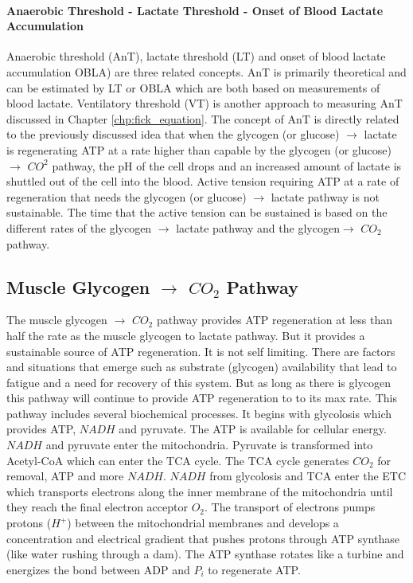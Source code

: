 \paragraph{Anaerobic Threshold - Lactate Threshold - Onset of Blood Lactate Accumulation}
Anaerobic threshold (AnT), lactate threshold (LT) and onset of blood lactate accumulation OBLA) are three related concepts. AnT is primarily theoretical and can be estimated by LT or OBLA which are both based on measurements of blood lactate. Ventilatory threshold (VT) is another approach to measuring AnT discussed in Chapter \ref{chp:fick_equation}. The concept of AnT is directly related to the previously discussed idea that when the glycogen (or glucose) $\rightarrow$ lactate is regenerating ATP at a rate higher than capable by the glycogen (or glucose) $\rightarrow$ $CO^2$ pathway, the pH of the cell drops and an increased amount of lactate is shuttled out of the cell into the blood. Active tension requiring ATP at a rate of regeneration that needs the glycogen (or glucose) $\rightarrow$ lactate pathway is not sustainable. The time that the active tension can be sustained is based on the different rates of the glycogen $\rightarrow$ lactate pathway and the glycogen$\rightarrow$ $CO_2$ pathway.

\subsection{Muscle Glycogen $\rightarrow$ $CO_2$ Pathway}

The muscle glycogen $\rightarrow$ $CO_2$ pathway provides ATP regeneration at less than half the rate as the muscle glycogen to lactate pathway. But it provides a sustainable source of ATP regeneration. It is not self limiting. There are factors and situations that emerge such as substrate (glycogen) availability that lead to fatigue and a need for recovery of this system. But as long as there is glycogen this pathway will continue to provide ATP regeneration to to its max rate. This pathway includes several biochemical processes. It begins with glycolosis which provides ATP, $NADH$ and pyruvate. The ATP is available for cellular energy. $NADH$ and pyruvate enter the mitochondria. Pyruvate is transformed into Acetyl-CoA which can enter the TCA cycle. The TCA cycle generates $CO_2$ for removal, ATP and more $NADH$. $NADH$ from glycolosis and TCA enter the ETC which transports electrons along the inner membrane of the mitochondria until they reach the final electron acceptor $O_2$. The transport of electrons pumps protons ($H^+$) between the mitochondrial membranes and develops a concentration and electrical gradient that pushes protons through ATP synthase (like water rushing through a dam). The ATP synthase rotates like a turbine and energizes the bond between ADP and $P_i$ to regenerate ATP. 


